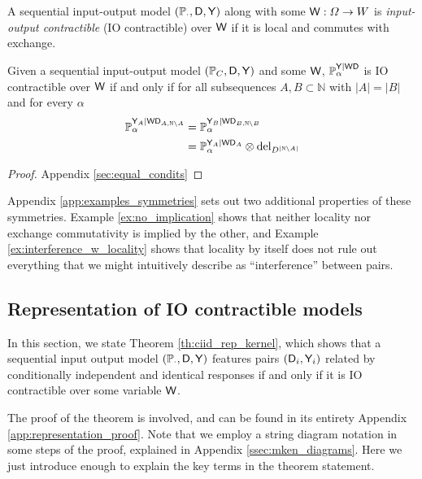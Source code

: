 \begin{definition}\label{def:ccontract}
A sequential input-output model $(\mathbb{P}_\cdot,\mathsf{D},\mathsf{Y})$ along with some $\mathsf{W}:\Omega\to W$ is \emph{input-output contractible} (IO contractible) over $\mathsf{W}$ if it is local and commutes with exchange.
\end{definition}

\begin{theorem}\label{th:equal_of_condits}
Given a sequential input-output model $(\mathbb{P}_C,\mathsf{D},\mathsf{Y})$ and some $\mathsf{W}$, $\mathbb{P}_\alpha^{\mathsf{Y}|\mathsf{WD}}$ is IO contractible over $\mathsf{W}$ if and only if for all subsequences $A,B\subset \mathbb{N}$ with $|A|=|B|$ and for every $\alpha$
\begin{align}
    \mathbb{P}_\alpha^{\mathsf{Y}_A|\mathsf{WD}_{A,\mathbb{N}\setminus A}} &= \mathbb{P}_\alpha^{\mathsf{Y}_B|\mathsf{WD}_{B,\mathbb{N}\setminus B}}\\
    &= \mathbb{P}_\alpha^{\mathsf{Y}_A|\mathsf{WD}_A}\otimes \text{del}_{D^{|\mathbb{N}\setminus A|}}
\end{align}
\end{theorem}

\begin{proof}
Appendix \ref{sec:equal_condits}
\end{proof}

Appendix \ref{app:examples_symmetries} sets out two additional properties of these symmetries. Example \ref{ex:no_implication} shows that neither locality nor exchange commutativity is implied by the other, and Example \ref{ex:interference_w_locality} shows that locality by itself does not rule out everything that we might intuitively describe as ``interference'' between pairs.

\subsection[Representation]{Representation of IO contractible models}\label{sec:rep_theorem}

In this section, we state Theorem \ref{th:ciid_rep_kernel}, which shows that a sequential input output model $(\mathbb{P}_\cdot,\mathsf{D},\mathsf{Y})$ features pairs $(\mathsf{D}_i,\mathsf{Y}_i)$ related by conditionally independent and identical responses if and only if it is IO contractible over some variable $\mathsf{W}$.

The proof of the theorem is involved, and can be found in its entirety Appendix \ref{app:representation_proof}. Note that we employ a string diagram notation in some steps of the proof, explained in Appendix \ref{ssec:mken_diagrams}. Here we just introduce enough to explain the key terms in the theorem statement. 

